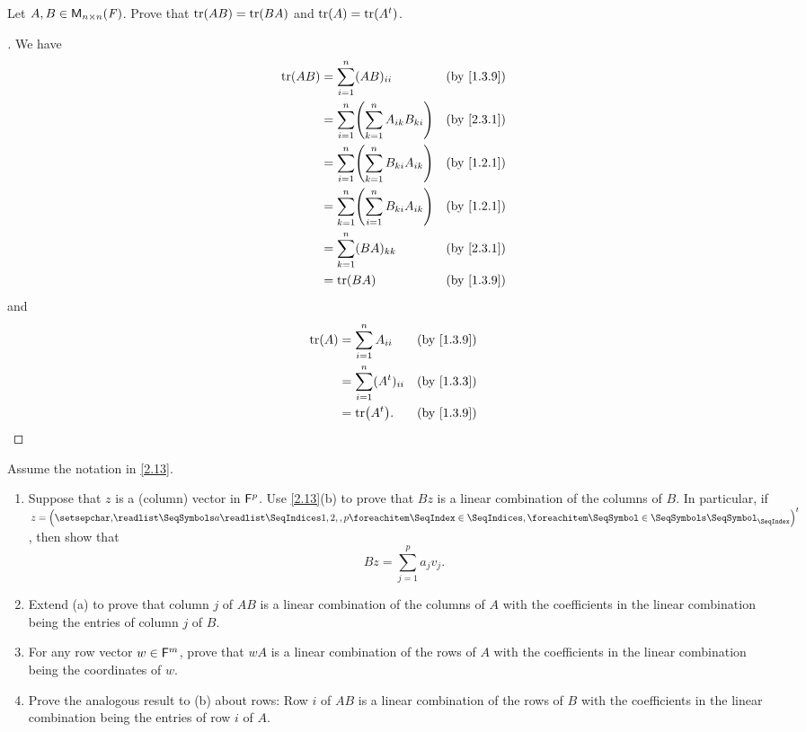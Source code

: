 \begin{ex}\label{ex:2.3.13}
	Let \(A, B \in \mathsf{M}_{{n} \times n}({\mathit{F}})\).
	Prove that \(\tr[AB] = \tr[BA]\) and \(\tr[A] = \tr[\tp{A}]\).
\end{ex}

\begin{proof}[]
	We have
	\begin{align*}
		\tr[AB] & = \sum_{i = 1}^n (AB)_{i i}                          &  & \by{1.3.9} \\
		        & = \sum_{i = 1}^n \pa{\sum_{k = 1}^n A_{i k} B_{k i}} &  & \by{2.3.1} \\
		        & = \sum_{i = 1}^n \pa{\sum_{k = 1}^n B_{k i} A_{i k}} &  & \by{1.2.1} \\
		        & = \sum_{k = 1}^n \pa{\sum_{i = 1}^n B_{k i} A_{i k}} &  & \by{1.2.1} \\
		        & = \sum_{k = 1}^n (BA)_{k k}                          &  & \by{2.3.1} \\
		        & = \tr[BA]                                            &  & \by{1.3.9}
	\end{align*}
	and
	\begin{align*}
		\tr[A] & = \sum_{i = 1}^n A_{i i}        &  & \by{1.3.9} \\
		       & = \sum_{i = 1}^n (\tp{A})_{i i} &  & \by{1.3.3} \\
		       & = \tr[\tp{A}].                  &  & \by{1.3.9}
	\end{align*}
\end{proof}

\begin{ex}\label{ex:2.3.14}
	Assume the notation in \cref{2.13}.
	\begin{enumerate}
		\item Suppose that \(z\) is a (column) vector in \(\mathsf{F}^p\).
		      Use \cref{2.13}(b) to prove that \(Bz\) is a linear combination of the columns of \(B\).
		      In particular, if \(z = \tp{\tuple{a}{1,2,,p}}\), then show that
		      \[
			      Bz = \sum_{j = 1}^p a_j v_j.
		      \]
		\item Extend (a) to prove that column \(j\) of \(AB\) is a linear combination of the columns of \(A\) with the coefficients in the linear combination being the entries of column \(j\) of \(B\).
		\item For any row vector \(w \in \mathsf{F}^m\), prove that \(wA\) is a linear combination of the rows of \(A\) with the coefficients in the linear combination being the coordinates of \(w\).
		\item Prove the analogous result to (b) about rows:
		      Row \(i\) of \(AB\) is a linear combination of the rows of \(B\) with the coefficients in the linear combination being the entries of row \(i\) of \(A\).
	\end{enumerate}
\end{ex}

